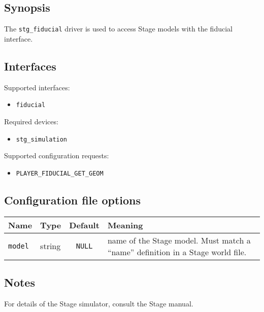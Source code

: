 \subsection*{Synopsis}

The {\tt stg\_fiducial} driver is used to access Stage models with the
fiducial interface.

\subsection*{Interfaces}

\noindent Supported interfaces:
\begin{itemize}
\item {\tt fiducial}
\end{itemize}

\noindent Required devices:
\begin{itemize}
\item {\tt stg\_simulation}
\end{itemize}

\noindent Supported configuration requests:
\begin{itemize}
\item \verb+PLAYER_FIDUCIAL_GET_GEOM+
\end{itemize}


\subsection*{Configuration file options}

\begin{center}
{\small \begin{tabularx}{\columnwidth}{|l|l|c|X|}
\hline
Name & Type & Default & Meaning\\
\hline
{\tt model} & string & {\tt NULL} & name of the Stage model. Must match a ``name'' definition in a Stage world file. \\
\hline
\end{tabularx}}
\end{center}

\subsection*{Notes}

For details of the Stage simulator, consult the Stage manual.

